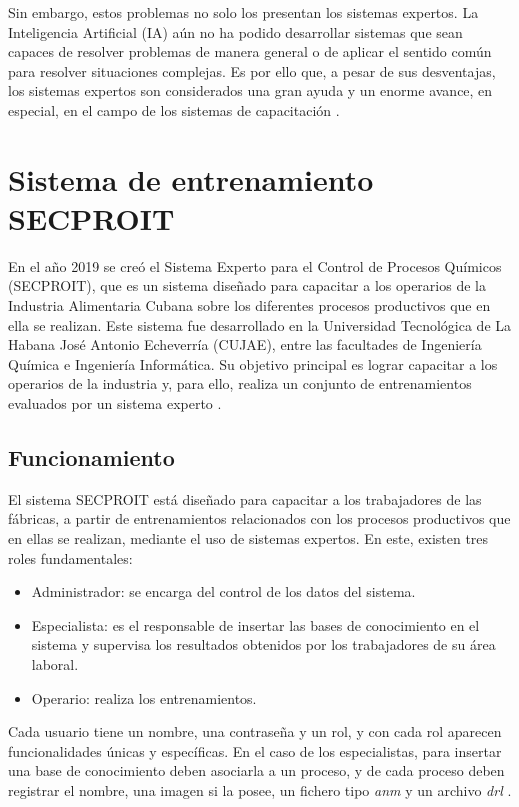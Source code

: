 Sin embargo, estos problemas no solo los presentan los sistemas expertos. La Inteligencia Artificial (IA) aún no ha podido desarrollar sistemas que
sean capaces de resolver problemas de manera general o de aplicar el sentido común para resolver situaciones complejas. Es por ello que, a pesar de sus desventajas, los sistemas expertos son considerados una gran ayuda y un enorme avance, en especial, en el campo de los sistemas de capacitación \cite{Barham2019}.

\section{Sistema de entrenamiento SECPROIT}
En el año 2019 se creó el Sistema Experto para el Control de Procesos Químicos (SECPROIT), que es un sistema diseñado para capacitar a los operarios de la Industria Alimentaria Cubana sobre los diferentes procesos productivos que en ella se realizan. Este sistema fue desarrollado en la Universidad Tecnológica de La Habana José Antonio Echeverría (CUJAE), entre las facultades de Ingeniería Química e Ingeniería Informática. Su objetivo principal es lograr capacitar a los operarios de la industria y, para ello, realiza un conjunto de entrenamientos evaluados por un sistema experto \cite{BasesConocimientoArt}.

\subsection{Funcionamiento}
El sistema SECPROIT está diseñado para capacitar a los trabajadores de las fábricas, a partir de entrenamientos relacionados con los procesos productivos que en ellas se realizan, mediante el uso de sistemas expertos. En este, existen tres roles fundamentales: 

\begin{itemize}
\item Administrador: se encarga del control de los datos del sistema.
\item Especialista: es el responsable de insertar las bases de conocimiento en el sistema y supervisa los resultados obtenidos por los trabajadores de su área laboral.
\item Operario: realiza los entrenamientos.
\end{itemize}

Cada usuario tiene un nombre, una contraseña y un rol, y con cada rol aparecen funcionalidades únicas y específicas. En el caso de los especialistas, para insertar una base de conocimiento deben asociarla a un proceso, y de cada proceso deben registrar el nombre, una imagen si la posee, un fichero tipo \textsl{anm} y un archivo \textsl{drl} \cite{SECPROIT}.


